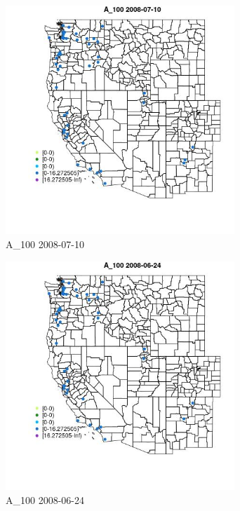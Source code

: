\begin{figure} 
\centering  
\includegraphics[width=0.77\textwidth]{Code_Outputs/Report_ML_input_PM25_Step4_part_e_de_duplicated_aves_MapObsA_1002008-07-10.jpg} 
\caption{\label{fig:Report_ML_input_PM25_Step4_part_e_de_duplicated_avesMapObsA_1002008-07-10}A_100 2008-07-10} 
\end{figure} 
 

\begin{figure} 
\centering  
\includegraphics[width=0.77\textwidth]{Code_Outputs/Report_ML_input_PM25_Step4_part_e_de_duplicated_aves_MapObsA_1002008-06-24.jpg} 
\caption{\label{fig:Report_ML_input_PM25_Step4_part_e_de_duplicated_avesMapObsA_1002008-06-24}A_100 2008-06-24} 
\end{figure} 
 

